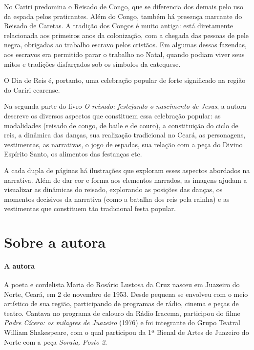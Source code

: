 \documentclass[11pt]{extarticle}
\begin{document}
No Cariri predomina o Reisado de Congo, que se diferencia dos demais pelo uso da espada pelos praticantes. Além do Congo, também há presença marcante do Reisado de Caretas. A tradição dos Congos é muito antiga: está diretamente relacionada aos primeiros anos da colonização, com a chegada das pessoas de pele negra, obrigadas ao trabalho escravo pelos cristãos. Em algumas dessas fazendas, aos escravos era permitido parar o trabalho no Natal, quando podiam viver seus mitos e tradições disfarçados sob os símbolos da catequese.

O Dia de Reis é, portanto, uma celebração popular de forte significado na região do Cariri cearense. 

Na segunda parte do livro  \textit{O reisado: festejando o nascimento de Jesus}, a autora descreve os diversos aspectos que constituem essa celebração popular: as modalidades (reisado de congo, de baile e de couro), a constituição do ciclo de reis, a dinâmica das danças, sua realização tradicional no Ceará, as personagens, vestimentas, as narrativas, o jogo de espadas, sua relação com a peça do Divino Espírito Santo, os alimentos das festanças etc.

A cada dupla de páginas há ilustrações que exploram esses aspectos abordados na narrativa. Além de dar cor e forma aos elementos narrados, as imagens ajudam a visualizar as dinâmicas do reisado, explorando as posições das danças, os momentos decisivos da narrativa (como a batalha dos reis pela rainha) e as vestimentas que constituem tão tradicional festa popular.


\section{Sobre a autora}


\paragraph{A autora}
A poeta e cordelista Maria do Rosário Lustosa da Cruz nasceu em Juazeiro do Norte, Ceará, em 2 de novembro de 1953. Desde pequena se envolveu com o meio artístico de sua região, participando de programas de rádio, cinema e peças de teatro. Cantava no programa de calouro da Rádio Iracema, participou do filme \textit{Padre Cícero: os milagres de Juazeiro} (1976) e foi integrante do Grupo Teatral William Shakespeare, com o qual participou da 1ª Bienal de Artes de Juazeiro do Norte com a peça \textit{Soraia, Posto 2}.
\end{document}

